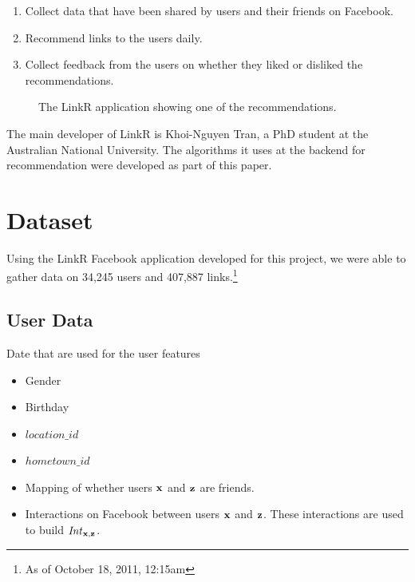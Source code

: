 \begin{enumerate}
\item{Collect data that have been shared by users and their friends on Facebook.}
\item{Recommend links to the users daily.}
\item{Collect feedback from the users on whether they liked or disliked the recommendations.}
\end{enumerate}

\begin{figure}[h]
\centering
{}
\caption{The LinkR application showing one of the recommendations.}
\end{figure}

The main developer of LinkR is Khoi-Nguyen Tran, a PhD student at the Australian National University. The algorithms it uses at the backend for recommendation were developed as part of this paper. 

\section{Dataset}

Using the LinkR Facebook application developed for this project, we were able to gather data on 34,245 users and 407,887 links.\footnote{As of October 18, 2011, 12:15am}

\subsection{User Data}

Date that are used for the user features 
\begin{itemize}
\item {Gender}
\item {Birthday}
\item {$location\_id$}
\item {$hometown\_id$}
\item {Mapping of whether users $\mathbf{x}$ and $\mathbf{z}$ are friends.}
\item {Interactions on Facebook between users $\mathbf{x}$ and $\mathbf{z}$. These interactions are used to build $\mathit{Int}_{\mathbf{x},\mathbf{z}}$. } 
\end{itemize}

